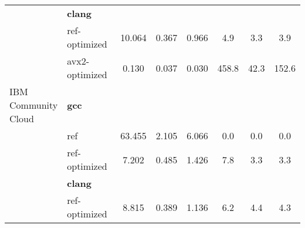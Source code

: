 \begin{table}[H]
\begin{tabularx}{\linewidth}{l l c c c c c c}
          & \textbf{clang} & & & & & \\
          & ref-optimized & 10.064 & 0.367 & 0.966 & 4.9 & 3.3 & 3.9\\
          & avx2-optimized & 0.130 & 0.037 & 0.030 & 458.8 & 42.3 & 152.6\\
          \midrule
          \multirowcell{5}{IBM\\ Community\\ Cloud}
          & \textbf{gcc} & & & & & \\
          & ref & 63.455 & 2.105 & 6.066 & 0.0 & 0.0 & 0.0\\
          & ref-optimized & 7.202 & 0.485 & 1.426 & 7.8 & 3.3 & 3.3\\
          & \textbf{clang} & & & & & \\
          & ref-optimized & 8.815 & 0.389 & 1.136 & 6.2 & 4.4 & 4.3\\
        \bottomrule
    \end{tabularx}
\end{table}